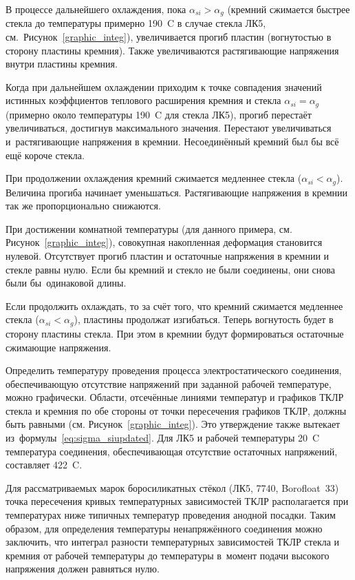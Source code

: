 В процессе дальнейшего охлаждения, пока $\alpha_{si} > \alpha_{g}$
(кремний сжимается быстрее стекла до температуры примерно 190~{\textdegree}C в случае стекла ЛК5, см.~Рисунок~\ref{graphic_integ}), увеличивается прогиб пластин (вогнутостью
в сторону пластины кремния). Также увеличиваются растягивающие напряжения внутри
пластины кремния.

Когда при дальнейшем охлаждении приходим к точке совпадения значений истинных
коэффциентов теплового расширения кремния и стекла $\alpha_{si} = \alpha_{g}$ %
(примерно около температуры 190~{\textdegree}C для стекла ЛК5), прогиб перестаёт увеличиваться,
достигнув максимального значения. Перестают увеличиваться и~растягивающие
напряжения в кремнии.
Несоединённый кремний был бы всё ещё короче стекла.

При продолжении охлаждения кремний сжимается медленнее стекла
\mbox{($\alpha_{si} < \alpha_{g}$)}. Величина прогиба начинает уменьшаться.
Растягивающие напряжения в кремнии так же пропорционально снижаются.

При достижении комнатной температуры (для данного примера, см.
Рисунок~\ref{graphic_integ}), совокупная накопленная деформация становится
нулевой. Отсутствует прогиб пластин и остаточные напряжения в кремнии и стекле
равны нулю.
Если бы кремний и стекло не были соединены, они снова были бы~одинаковой длины.

Если продолжить охлаждать, то за счёт того, что кремний сжимается медленнее
стекла ($\alpha_{si} < \alpha_{g}$), пластины продолжат изгибаться. Теперь
вогнутость будет в сторону пластины стекла. При этом в кремнии будут формироваться
остаточные сжимающие напряжения.

Определить температуру проведения процесса электростатического соединения,
обеспечивающую отсутствие напряжений при заданной рабочей температуре, можно
графически. Области, отсечённые линиями температур и графиков ТКЛР стекла и
кремния по обе стороны от точки пересечения графиков ТКЛР, должны быть равными
(см. Рисунок~\ref{graphic_integ}). Это утверждение также вытекает
из~формулы~\eqref{eq:sigma_siupdated}. Для ЛК5 и рабочей температуры
20~{\textdegree}C температура соединения, обеспечивающая отсутствие остаточных
напряжений, составляет 422~{\textdegree}C.

Для рассматриваемых марок боросиликатных стёкол (ЛК5, 7740, Borofloat~33) точка
пересечения кривых температурных зависимостей ТКЛР располагается при
температурах ниже типичных температур проведения анодной посадки. Таким образом,
для определения температуры ненапряжённого соединения можно заключить, что
интеграл разности температурных зависимостей ТКЛР стекла и кремния от рабочей
температуры до температуры в~момент подачи высокого напряжения должен равняться
нулю.


